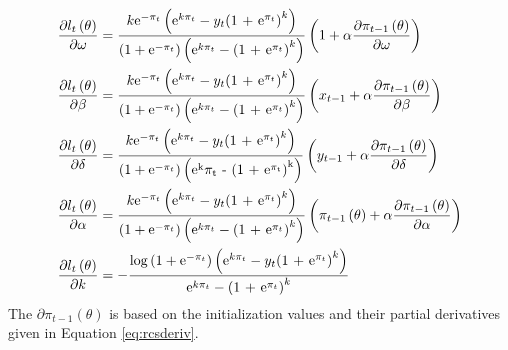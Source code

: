 \begin{equation}
\begin{gathered}
  \frac{{\partial {l_t}\left( \theta  \right)}}
{{\partial \omega }} = \frac{{k{{\text{e}}^{ - {\pi _t}}}\left( {{{\text{e}}^{k{\pi _t}}} - {y_t}{{\left( {{\text{1 + }}{{\text{e}}^{{\pi _t}}}} \right)}^k}} \right)}}
{{\left( {1 + {{\text{e}}^{ - {\pi _t}}}} \right)\left( {{{\text{e}}^{k{\pi _t}}} - {{\left( {{\text{1 + }}{{\text{e}}^{{\pi _t}}}} \right)}^k}} \right)}}\left( {1 + \alpha \frac{{\partial {\pi _{t - 1}}\left( \theta  \right)}}
{{\partial \omega }}} \right) \hfill \\
  \frac{{\partial {l_t}\left( \theta  \right)}}
{{\partial \beta }} = \frac{{k{{\text{e}}^{ - {\pi _t}}}\left( {{{\text{e}}^{k{\pi _t}}} - {y_t}{{\left( {{\text{1 + }}{{\text{e}}^{{\pi _t}}}} \right)}^k}} \right)}}
{{\left( {1 + {{\text{e}}^{ - {\pi _t}}}} \right)\left( {{{\text{e}}^{k{\pi _t}}} - {{\left( {{\text{1 + }}{{\text{e}}^{{\pi _t}}}} \right)}^k}} \right)}}\left( {{x_{t - 1}} + \alpha \frac{{\partial {\pi _{t - 1}}\left( \theta  \right)}}
{{\partial \beta }}} \right) \hfill \\
  \frac{{\partial {l_t}\left( \theta  \right)}}
{{\partial \delta }} = \frac{{k{{\text{e}}^{ - {\pi _t}}}\left( {{{\text{e}}^{k{\pi _t}}} - {y_t}{{\left( {{\text{1 + }}{{\text{e}}^{{\pi _t}}}} \right)}^k}} \right)}}
{{\left( {1 + {{\text{e}}^{ - {\pi _t}}}} \right)\left( {{{\text{e}}^{\text{k}}}{\pi _{\text{t}}}{\text{ - }}{{\left( {{\text{1 + }}{{\text{e}}^{{\pi _{\text{t}}}}}} \right)}^{\text{k}}}} \right)}}\left( {{y_{t - 1}} + \alpha \frac{{\partial {\pi _{t - 1}}\left( \theta  \right)}}
{{\partial \delta }}} \right) \hfill \\
  \frac{{\partial {l_t}\left( \theta  \right)}}
{{\partial \alpha }} = \frac{{k{{\text{e}}^{ - {\pi _t}}}\left( {{{\text{e}}^{k{\pi _t}}} - {y_t}{{\left( {{\text{1 + }}{{\text{e}}^{{\pi _t}}}} \right)}^k}} \right)}}
{{\left( {1 + {{\text{e}}^{ - {\pi _t}}}} \right)\left( {{{\text{e}}^{k{\pi _t}}} - {{\left( {{\text{1 + }}{{\text{e}}^{{\pi _t}}}} \right)}^k}} \right)}}\left( {{\pi _{t - 1}}\left( \theta  \right) + \alpha \frac{{\partial {\pi _{t - 1}}\left( \theta  \right)}}
{{\partial \alpha }}} \right) \hfill \\
  \frac{{\partial {l_t}\left( \theta  \right)}}
{{\partial k}} =  - \frac{{\log \left( {1 + {{\text{e}}^{ - {\pi _t}}}} \right)\left( {{{\text{e}}^{k{\pi _t}}} - {y_t}{{\left( {{\text{1 + }}{{\text{e}}^{{\pi _t}}}} \right)}^k}} \right)}}
{{{{\text{e}}^{k{\pi _t}}} - {{\left( {{\text{1 + }}{{\text{e}}^{{\pi _t}}}} \right)}^k}}} \hfill \\
\end{gathered}
\end{equation}
The ${\partial {\pi _{t - 1}}\left( \theta  \right)}$ is based on the initialization values and their partial derivatives given in Equation \ref{eq:rcsderiv}.
